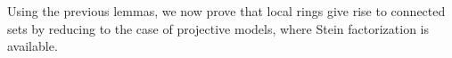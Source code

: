 \documentclass[preprint, 11pt,nonatbib]{elsarticle}
\DeclareMathOperator{\Dom}{Val}
\DeclareMathOperator{\Spec}{Spec}
\DeclareMathOperator{\Zar}{Zar}
\newtheorem{lemma}[theorem]{Lemma}
\theoremstyle{definition}
\newtheorem{remark}[theorem]{Remark}
\numberwithin{theorem}{section}
\begin{document}







 



 





Using the previous lemmas, we now     prove that local rings give rise to connected sets by reducing to   the case of projective models, where Stein factorization is available. 
\end{document}
